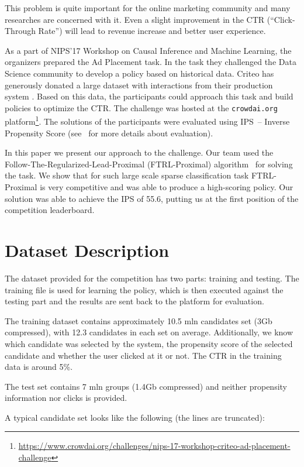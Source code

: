 \documentclass{sig-alternate}
\begin{document}
This problem is quite important for the online marketing community and many researches are concerned with it. Even a slight improvement
in the CTR (``Click-Through Rate'') will lead to revenue increase and 
better user experience.

As a part of NIPS'17 Workshop on Causal Inference and Machine Learning, the 
organizers prepared the Ad Placement task. In the task they challenged the 
Data Science community to develop a policy based on historical data. 
Criteo has generously donated
a large dataset with interactions from their production system
\cite{lefortier2016large}. Based on this data, the participants could 
approach this task and build policies to optimize the CTR.
The challenge was hosted at the \texttt{crowdai.org} 
platform\footnote{\url{https://www.crowdai.org/challenges/nips-17-workshop-criteo-ad-placement-challenge}}.
The solutions of the participants were evaluated using IPS~-- Inverse Propensity Score (see~\cite{lefortier2016large} for more details about evaluation). 

In this paper we present our approach to the challenge. 
Our team used the Follow-The-Regularized-Lead-Proximal (FTRL-Proximal) 
algorithm~\cite{ftrl} for solving the task. 
We show that for such large scale sparse classification task 
FTRL-Proximal is very competitive and was able to produce a high-scoring policy.
Our solution was able to achieve the IPS of 55.6, putting us at the first position of the competition leaderboard. 


\section{Dataset Description}

The dataset provided for the competition has two parts: training and testing. 
The training file is used for learning the policy, which is then executed against 
the testing part and the results are sent back to the platform for evaluation.

The training dataset contains approximately 10.5 mln 
candidates set (3Gb compressed), with 12.3 candidates in each set on average. 
Additionally, we know which candidate was
selected by the system, the propensity score of the selected candidate 
and whether the user clicked at it or not. The CTR in the training data
is around 5\%. 

The test set contains 7 mln groups (1.4Gb compressed) and neither propensity information nor clicks is provided.

A typical candidate set looks like the following (the lines are truncated):
\end{document}
